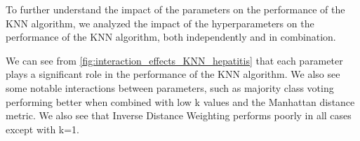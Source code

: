 To further understand the impact of the parameters on the performance of the KNN algorithm,
we analyzed the impact of the hyperparameters on the performance of the KNN algorithm, both independently and in combination.

We can see from \autoref{fig:interaction_effects_KNN_hepatitis} that each parameter plays a significant role in the performance of the KNN algorithm.
We also see some notable interactions between parameters, such as majority class voting performing better when combined with low k values and the Manhattan distance metric.
We also see that Inverse Distance Weighting performs poorly in all cases except with k=1.
